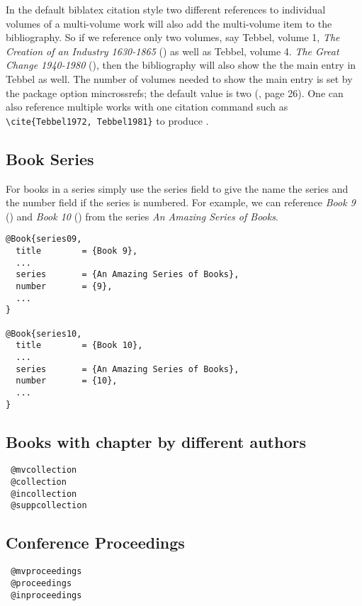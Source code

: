\documentclass{article}
\begin{document}
In the default {\ttfamily biblatex} citation style two different
references to individual volumes of a multi-volume work will also add
the multi-volume item to the bibliography. So if we reference only two
volumes, say Tebbel, volume 1, {\itshape The Creation of an Industry
  1630-1865} (\cite{Tebbel1972}) as well as Tebbel, volume
4. {\itshape The Great Change 1940-1980} (\cite{Tebbel1981}), then the
bibliography will also show the the main entry in Tebbel as well. The
number of volumes needed to show the main entry is set by the package
option {\ttfamily mincrossrefs}; the default value is two
(\cite{Kime2019}, page 26).  One can also reference multiple works
with one citation command such as \verb|\cite{Tebbel1972, Tebbel1981}|
to produce \cite{Tebbel1972, Tebbel1981}.

\subsection{Book Series}

For books in a series simply use the {\ttfamily series} field to give
the name the series and the {\ttfamily number} field if the series is
numbered. For example, we can reference {\itshape Book 9}
(\cite{book09}) and {\itshape Book 10} (\cite{book10}) from the series
{\itshape An Amazing Series of Books}.

\begin{verbatim}
@Book{series09,
  title        = {Book 9},
  ...
  series       = {An Amazing Series of Books},
  number       = {9},
  ...
}

@Book{series10,
  title        = {Book 10},
  ...
  series       = {An Amazing Series of Books},
  number       = {10},
  ...
}
\end{verbatim}


\subsection{Books with chapter by different authors}
\begin{verbatim}
 @mvcollection
 @collection
 @incollection
 @suppcollection
\end{verbatim}

\subsection{Conference Proceedings}
\begin{verbatim}
 @mvproceedings
 @proceedings
 @inproceedings
\end{verbatim}
\end{document}
